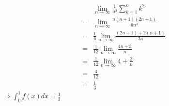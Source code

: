 \documentclass{HM}
\begin{document}
\begin{enumerate}
\begin{enumerate}
\begin{align*}
		 	&\lim\limits_{n\to\infty}\frac{1}{n^3}\sum\limits_{k=1}^{n}k^2\\
		 	=&\lim\limits_{n\to\infty}\frac{n(n+1)(2n+1)}{6n^3}\\
		 	=&\frac{1}{6}\lim\limits_{n\to\infty}\frac{(2n+1)+2(n+1)}{2n}\\
		 	=&\frac{1}{12}\lim\limits_{n\to\infty}\frac{4n+3}{n}\\
		 	=&\frac{1}{12}\lim\limits_{n\to\infty}4+\frac{3}{n}\\
		 	=&\frac{4}{12}\\
		 	=&\frac{1}{3}
		 	\end{align*}
		 	$\Rightarrow \int_0^1f(x)dx=\frac{1}{3}$
		 \end{enumerate}
	\end{enumerate}
\end{document}
